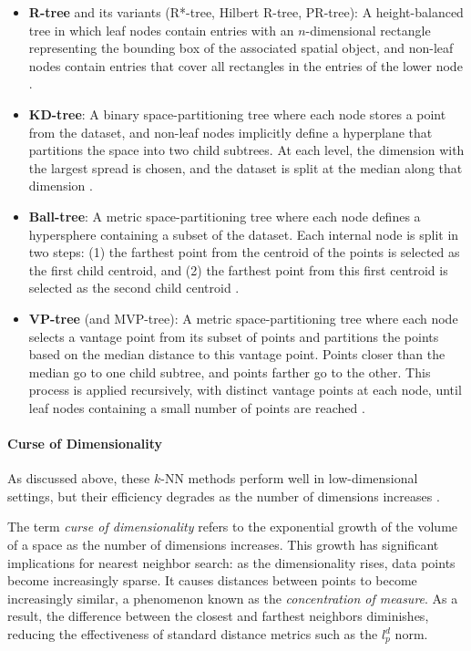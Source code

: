 \begin{itemize}
    \item \textbf{R-tree} and its variants (R*-tree, Hilbert R-tree, PR-tree): A height-balanced tree in which leaf nodes contain entries with an $n$-dimensional rectangle representing the bounding box of the associated spatial object, and non-leaf nodes contain entries that cover all rectangles in the entries of the lower node \cite{Guttman-1984}.
    \item \textbf{KD-tree}: A binary space-partitioning tree where each node stores a point from the dataset, and non-leaf nodes implicitly define a hyperplane that partitions the space into two child subtrees. At each level, the dimension with the largest spread is chosen, and the dataset is split at the median along that dimension \cite{Skrodzki-2019}.
    \item \textbf{Ball-tree}: A metric space-partitioning tree where each node defines a hypersphere containing a subset of the dataset. Each internal node is split in two steps: (1) the farthest point from the centroid of the points is selected as the first child centroid, and (2) the farthest point from this first centroid is selected as the second child centroid \cite{Dolatshah-Hadian-Minaei-2015}.
    \item \textbf{VP-tree} (and MVP-tree): A metric space-partitioning tree where each node selects a vantage point from its subset of points and partitions the points based on the median distance to this vantage point. Points closer than the median go to one child subtree, and points farther go to the other. This process is applied recursively, with distinct vantage points at each node, until leaf nodes containing a small number of points are reached \cite{Fu-Chan-Cheung-Moon-2000}.
\end{itemize}

\paragraph{Curse of Dimensionality}

As discussed above, these $k$-NN methods perform well in low-dimensional settings, but their efficiency degrades as the number of dimensions increases \cite{Ukey-Yang-Li-Zhang-Hu-Zhang-2023}.

The term \emph{curse of dimensionality} refers to the exponential growth of the volume of a space as the number of dimensions increases. This growth has significant implications for nearest neighbor search: as the dimensionality rises, data points become increasingly sparse. It causes distances between points to become increasingly similar, a phenomenon known as the \emph{concentration of measure}. As a result, the difference between the closest and farthest neighbors diminishes, reducing the effectiveness of standard distance metrics such as the $l_p^d$ norm.

